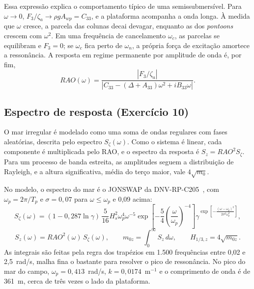 \documentclass[11pt,a4paper]{article}
\newcommand{\Hz}{H_{1/3,z}}
\begin{document}
Essa expressão explica o comportamento típico de uma semissubmersível. Para $\omega \to 0$,
$F_3/\zeta_a \to \rho g A_{wp} = C_{33}$, e a plataforma acompanha a onda longa. À medida que
$\omega$ cresce, a parcela das colunas decai devagar, enquanto as dos \emph{pontoons} crescem com
$\omega^2$. Em uma frequência de cancelamento $\omega_c$, as parcelas se equilibram e $F_3 = 0$;
se $\omega_c$ fica perto de $\omega_n$, a própria força de excitação amortece a ressonância. A
resposta em regime permanente por amplitude de onda é, por fim,
\begin{equation}
RAO(\omega) = \frac{|F_3/\zeta_a|}{\left|C_{33} - (\Delta + A_{33})\omega^2 + i B_{33}\omega\right|} .
\end{equation}

\subsection{Espectro de resposta (Exercício 10)}\label{sec:espectro-teoria}

O mar irregular é modelado como uma soma de ondas regulares com fases aleatórias, descrita pelo
espectro $S_\zeta(\omega)$. Como o sistema é linear, cada componente é multiplicada pelo RAO, e o
espectro da resposta é $S_z = RAO^2 S_\zeta$. Para um processo de banda estreita, as amplitudes
seguem a distribuição de Rayleigh, e a altura significativa, média do terço maior, vale
$4\sqrt{m_0}$.

No modelo, o espectro do mar é o JONSWAP da DNV-RP-C205~\cite{c205}, com $\omega_p = 2\pi/T_p$ e
$\sigma = 0{,}07$ para $\omega \le \omega_p$ e 0,09 acima:
\begin{equation}
S_\zeta(\omega) = (1 - 0{,}287\ln\gamma)\,\frac{5}{16} H_s^2 \omega_p^4 \omega^{-5}
\exp\!\left[-\frac54\left(\frac{\omega}{\omega_p}\right)^{-4}\right]
\gamma^{\exp\left[-\frac{(\omega - \omega_p)^2}{2\sigma^2\omega_p^2}\right]} ,
\end{equation}
\begin{equation}
S_z(\omega) = RAO^2(\omega)\, S_\zeta(\omega), \qquad m_{0z} = \int_0^\infty S_z\, d\omega,
\qquad \Hz = 4\sqrt{m_{0z}} .
\end{equation}
As integrais são feitas pela regra dos trapézios em 1.500 frequências entre 0,02 e 2,5~rad/s,
malha fina o bastante para resolver o pico de ressonância. No pico do mar do campo,
$\omega_p = 0{,}413$~rad/s, $k = 0{,}0174$~m$^{-1}$ e o comprimento de onda é de 361~m, cerca de
três vezes o lado da plataforma.
\end{document}
